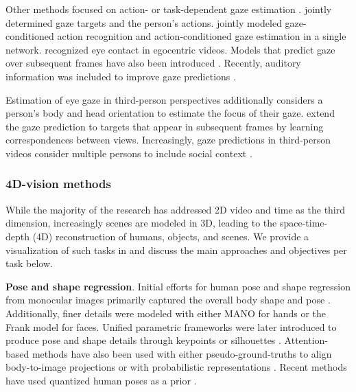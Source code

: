 Other methods focused on action- or task-dependent gaze estimation .  jointly determined gaze targets and the person's actions.  jointly modeled gaze-conditioned action recognition and action-conditioned gaze estimation in a single network.  recognized eye contact in egocentric videos. Models that predict gaze over subsequent frames have also been introduced . Recently, auditory information was included to improve gaze predictions .

Estimation of eye gaze in third-person perspectives additionally considers a person's body and head orientation  to estimate the focus of their gaze.  extend the gaze prediction to targets that appear in subsequent frames by learning correspondences between views. Increasingly, gaze predictions in third-person videos consider multiple persons to include social context .



\subsubsection{4D-vision methods} 
\label{sec:recognition::audio:::4dmethods}

While the majority of the research has addressed 2D video and time as the third dimension, increasingly scenes are modeled in 3D, leading to the space-time-depth (4D) reconstruction of humans, objects, and scenes. We provide a visualization of such tasks in  and discuss the main approaches and objectives per task below.

\noindent
\textbf{Pose and shape regression}. Initial efforts for human pose and shape regression from monocular images primarily captured the overall body shape and pose . Additionally, finer details were modeled with either MANO  for hands or the Frank model  for faces. Unified parametric frameworks were later introduced to produce pose and shape details through keypoints  or silhouettes . Attention-based methods have also been used with either pseudo-ground-truths to align body-to-image projections  or with probabilistic representations . Recent methods have used quantized human poses as a prior .


